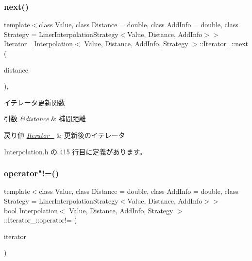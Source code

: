 \subsubsection{\texorpdfstring{next()}{next()}}
{\footnotesize\ttfamily template$<$class Value, class Distance = double, class Add\+Info = double, class Strategy = Liner\+Interpolation\+Strategy$<$\+Value, Distance, Add\+Info$>$$>$ \\
\mbox{\hyperlink{class_interpolation_1_1_iterator__}{Iterator\+\_\+}} \mbox{\hyperlink{class_interpolation}{Interpolation}}$<$ Value, Distance, Add\+Info, Strategy $>$\+::Iterator\+\_\+\+::next (\begin{DoxyParamCaption}\item[{Distance \&}]{distance }\end{DoxyParamCaption})\hspace{0.3cm}{\ttfamily [inline]}, {\ttfamily [private]}}



イテレータ更新関数 


\begin{DoxyParams}{引数}
{\em \&distance} & 補間距離 \\
\hline
\end{DoxyParams}

\begin{DoxyRetVals}{戻り値}
{\em \mbox{\hyperlink{class_interpolation_1_1_iterator__}{Iterator\+\_\+}}} & 更新後のイテレータ \\
\hline
\end{DoxyRetVals}


 Interpolation.\+h の 415 行目に定義があります。

\mbox{\label{class_interpolation_1_1_iterator___a60ad4c8de6408cac63947d0c11db011a}} 
\subsubsection{\texorpdfstring{operator"!=()}{operator!=()}}
{\footnotesize\ttfamily template$<$class Value, class Distance = double, class Add\+Info = double, class Strategy = Liner\+Interpolation\+Strategy$<$\+Value, Distance, Add\+Info$>$$>$ \\
bool \mbox{\hyperlink{class_interpolation}{Interpolation}}$<$ Value, Distance, Add\+Info, Strategy $>$\+::Iterator\+\_\+\+::operator!= (\begin{DoxyParamCaption}\item[{\mbox{\hyperlink{class_interpolation_1_1_iterator__}{Iterator\+\_\+}}}]{iterator }\end{DoxyParamCaption})\hspace{0.3cm}{\ttfamily [inline]}}



